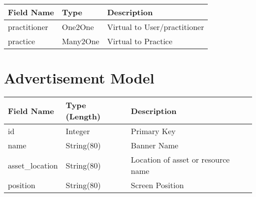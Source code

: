 \documentclass[letterpaper,10pt,english]{sphinxmanual}
\begin{document}
\begin{tabulary}{\linewidth}{|L|L|L|}
\hline
\textsf{\relax 
Field Name
} & \textsf{\relax 
Type
} & \textsf{\relax 
Description
}\\
\hline
practitioner
 & 
One2One
 & 
Virtual to User/practitioner
\\

practice
 & 
Many2One
 & 
Virtual to Practice
\\
\hline\end{tabulary}



\section{Advertisement Model}
\label{dev-models:advertisement-model}\label{dev-models:advertisement-model-label}
\begin{tabulary}{\linewidth}{|L|L|L|}
\hline
\textsf{\relax 
Field Name
} & \textsf{\relax 
Type (Length)
} & \textsf{\relax 
Description
}\\
\hline
id
 & 
Integer
 & 
Primary Key
\\

name
 & 
String(80)
 & 
Banner Name
\\

asset\_location
 & 
String(80)
 & 
Location of asset or resource name
\\

position
 & 
String(80)
 & 
Screen Position
\\
\hline\end{tabulary}
\end{document}
